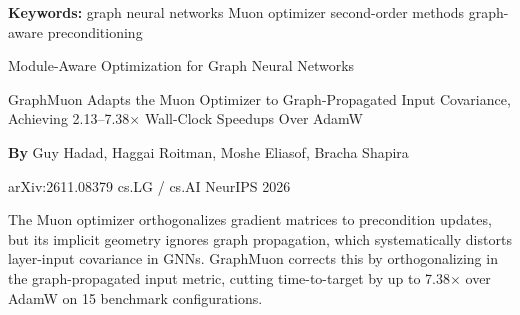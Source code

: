 \documentclass[10pt,twocolumn]{article}
\begin{document}
\setlength{\parindent}{0pt}
\setlength{\parskip}{4pt}

{\small\color{keywordgray}\textbf{Keywords:}
  graph neural networks \textbullet{}
  Muon optimizer \textbullet{}
  second-order methods \textbullet{}
  graph-aware preconditioning}\par\vspace{4pt}

{\LARGE\bfseries\raggedright
  Module-Aware Optimization for Graph Neural Networks}\par\vspace{4pt}

{\large\itshape\raggedright
  GraphMuon Adapts the Muon Optimizer to Graph-Propagated Input Covariance,
  Achieving 2.13--7.38$\times$ Wall-Clock Speedups Over AdamW}\par\vspace{6pt}

{\small\textbf{By} Guy Hadad, Haggai Roitman, Moshe Eliasof, Bracha Shapira}\par\vspace{2pt}

{\small\color{keywordgray}arXiv:2611.08379 \textbullet{}
  cs.LG / cs.AI \textbullet{} NeurIPS 2026}
\par\vspace{2pt}\noindent{\color{rulered}\rule{\columnwidth}{0.6pt}}\vspace{6pt}

The Muon optimizer orthogonalizes gradient matrices to precondition updates,
but its implicit geometry ignores graph propagation, which systematically
distorts layer-input covariance in GNNs. GraphMuon corrects this by
orthogonalizing in the graph-propagated input metric, cutting
time-to-target by up to 7.38$\times$ over AdamW on 15 benchmark
configurations.
\end{document}
